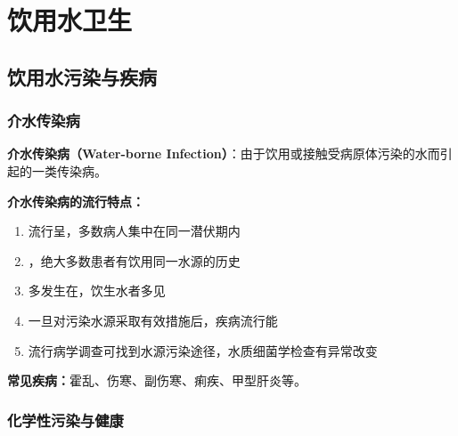 \chapter{饮用水卫生}
\setcounter{chapter}{6}

\section{饮用水污染与疾病}

\subsection{介水传染病}

\begin{defbox}
\textbf{介水传染病（Water-borne Infection）}：由于饮用或接触受病原体污染的水而引起的一类传染病。
\end{defbox}

\begin{keybox}
\textbf{介水传染病的流行特点：}
\begin{enumerate}[leftmargin=*]
    \item 流行呈，多数病人集中在同一潜伏期内
    \item {}，绝大多数患者有饮用同一水源的历史
    \item 多发生在，饮生水者多见
    \item 一旦对污染水源采取有效措施后，疾病流行能
    \item 流行病学调查可找到水源污染途径，水质细菌学检查有异常改变
\end{enumerate}
\textbf{常见疾病：}霍乱、伤寒、副伤寒、痢疾、甲型肝炎等。
\end{keybox}

\subsection{化学性污染与健康}

